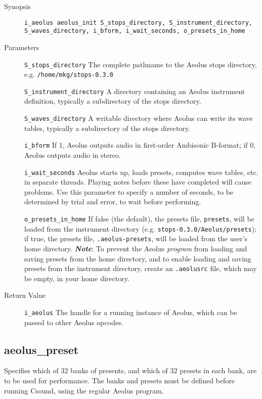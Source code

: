\documentclass[english,11pt,letterpaper,onecolumn]{scrartcl}
\begin{document}
{\begin{description}
	\item[Synopsis]
	\item[]\lstinline|i_aeolus aeolus_init S_stops_directory, S_instrument_directory, S_waves_directory, i_bform, i_wait_seconds, o_presets_in_home|
	\item[Parameters]
	\item[]\lstinline|S_stops_directory| The complete pathname to the Aeolus stops directory, e.g. \lstinline|/home/mkg/stops-0.3.0|
	\item[]\lstinline|S_instrument_directory| A directory containing an Aeolus instrument definition, typically a subdirectory of the stops directory.
	\item[]\lstinline|S_waves_directory| A writable directory where Aeolus can write its wave tables, typically a subdirectory of the stops directory.
	\item[]\lstinline|i_bform| If 1, Aeolus outputs audio in first-order Ambisonic B-format; if 0, Aeolus outputs audio in stereo.
	\item[]\lstinline|i_wait_seconds| Aeolus starts up, loads presets, computes wave tables, etc. in separate threads. Playing notes before these have completed will cause problems. Use this parameter to specify a number of seconds, to be determined by trial and error, to wait before performing.
	\item[]\lstinline|o_presets_in_home| If false (the default), the presets file, \lstinline|presets|, will be loaded from the instrument directory (e.g. \lstinline|stops-0.3.0/Aeolus/presets|); if true, the presets file, \lstinline|.aeolus-presets|, will be loaded from the user's home directory. \textit{\textbf{Note}}: To prevent the Aeolus \emph{program} from loading and saving presets from the home directory, and to enable loading and saving presets from the instrument directory, create an \lstinline|.aeolusrc| file, which may be empty, in your home directory.
	\item[Return Value]
	\item[]\lstinline|i_aeolus| The handle for a running instance of Aeolus, which can be passed to other Aeolus opcodes.
\end{description}

\subsection*{aeolus\_preset}

Specifies which of 32 banks of presents, and which of 32 presets in each bank, are to be used for performance. The banks and presets must be defined before running Csound, using the regular Aeolus program.

}
\end{document}
